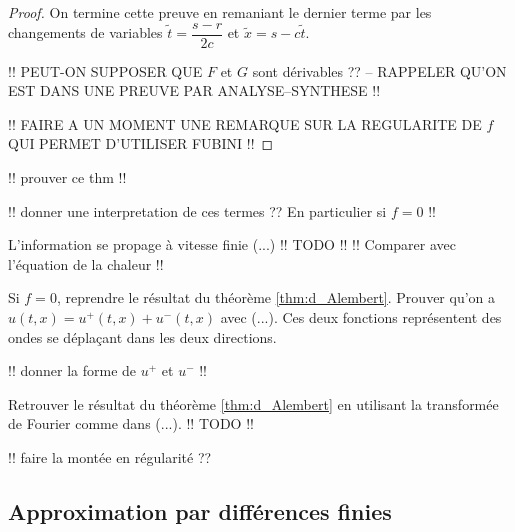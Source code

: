 \documentclass[12pt,a4paper,twoside]{article}
\begin{document}
\begin{proof}
  On termine cette preuve en remaniant le dernier terme par les changements de variables
  $\tilde{t} = \dfrac{s-r}{2c}$ et $\tilde{x} = s - c \tilde{t}$.

  !! PEUT-ON SUPPOSER QUE $F$ et $G$ sont d\'erivables ??
  -- RAPPELER QU'ON EST DANS UNE PREUVE PAR ANALYSE--SYNTHESE !!

  !! FAIRE A UN MOMENT UNE REMARQUE SUR LA REGULARITE DE $f$
  QUI PERMET D'UTILISER FUBINI !!
\end{proof}



!! prouver ce thm !!

!! donner une interpretation de ces termes ??
En particulier si $f=0$ !!

\begin{remark}
  L'information se propage \`a vitesse finie (...)
  !! TODO !! !! Comparer avec l'\'equation de la chaleur !!
\end{remark}

\begin{exercise}
  Si $f=0$, reprendre le r\'esultat du th\'eor\`eme \ref{thm:d_Alembert}.
  Prouver qu'on a $u(t,x) = u^+(t,x) + u^-(t,x)$
  avec (...).
  Ces deux fonctions repr\'esentent des ondes se d\'epla\c{c}ant
  dans les deux directions.

  !! donner la forme de $u^+$ et $u^-$ !!
\end{exercise}

\begin{exercise}
  Retrouver le r\'esultat du th\'eor\`eme \ref{thm:d_Alembert}
  en utilisant la transform\'ee de Fourier comme dans (...).
  !! TODO !!
\end{exercise}


!! faire la mont\'ee en r\'egularit\'e ??

\subsection{Approximation par diff\'erences finies}
\end{document}
